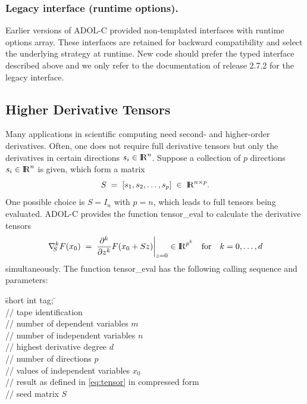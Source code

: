 \documentclass[11pt,twoside]{article}
\newcommand{\R}{{ {\rm I} \kern -.225em {\rm R} }}
\begin{document}
\subsubsection{Legacy interface (runtime options).}
Earlier versions of ADOL-C provided non-templated interfaces with runtime
{\sf options} array. These interfaces are retained for backward
compatibility and select the underlying strategy at runtime.
New code should prefer the typed interface described above and we only refer to the 
documentation of release 2.7.2 for the legacy interface.



\subsection{Higher Derivative Tensors}
\label{higherOrderDeriv}
%
Many applications in scientific computing need second- and higher-order
derivatives. Often, one does not require full derivative tensors but 
only the derivatives in certain directions $s_i \in \R^{n}$.
Suppose a collection of $p$ directions
$s_i \in \R^{n}$ is given, which form a matrix
\[
S\; =\; \left [ s_1, s_2,\ldots,  s_p \right ]\; \in \;
 \R^{n \times p}.
\]
One possible choice is $S = I_n$ with  $p = n$, which leads to
full tensors being evaluated. 
ADOL-C provides the function {\sf tensor\_eval}
to calculate the derivative tensors
\begin{eqnarray}
\label{eq:tensor}
\left. \nabla_{\mbox{$\scriptstyle \!\!S$}}^{k}
     F(x_0) \; = \; \frac{\partial^k}{\partial z^k} F(x_0+Sz) \right |_{z=0} 
     \in \R^{p^k}\quad \mbox{for} \quad k = 0,\ldots,d
\end{eqnarray}
simultaneously. The function {\sf tensor\_eval} has the following calling sequence and 
parameters:
%
\begin{tabbing}
\hspace{0.5in}\={\sf short int tag;} \hspace{1.1in}\= \kill    %
\\
         \> // tape identification \\
                 \> // number of dependent variables $m$ \\
                 \> // number of independent variables $n$\\
                 \> // highest derivative degree $d$\\
                 \> // number of directions $p$\\
           \> // values of independent variables $x_0$\\
\> // result as defined in \eqref{eq:tensor} in compressed form\\
        \> // seed matrix $S$
\end{tabbing}
\end{document}

